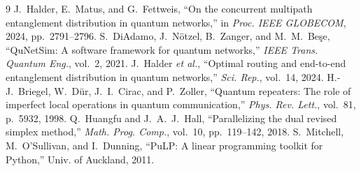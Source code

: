 \documentclass[conference]{IEEEtran}
\begin{document}
\begin{thebibliography}{9}
 J.~Halder, E.~Matus, and G.~Fettweis, ``On the concurrent multipath entanglement distribution in quantum networks,'' in \emph{Proc. IEEE GLOBECOM}, 2024, pp.~2791--2796.
 S.~DiAdamo, J.~N\"otzel, B.~Zanger, and M.~M.~Be\c{s}e, ``QuNetSim: A software framework for quantum networks,'' \emph{IEEE Trans. Quantum Eng.}, vol.~2, 2021.
 J.~Halder \emph{et al.}, ``Optimal routing and end-to-end entanglement distribution in quantum networks,'' \emph{Sci. Rep.}, vol.~14, 2024.
 H.-J.~Briegel, W.~D\"ur, J.~I.~Cirac, and P.~Zoller, ``Quantum repeaters: The role of imperfect local operations in quantum communication,'' \emph{Phys. Rev. Lett.}, vol.~81, p.~5932, 1998.
 Q.~Huangfu and J.~A.~J.~Hall, ``Parallelizing the dual revised simplex method,'' \emph{Math. Prog. Comp.}, vol.~10, pp.~119--142, 2018.
 S.~Mitchell, M.~O'Sullivan, and I.~Dunning, ``PuLP: A linear programming toolkit for Python,'' Univ. of Auckland, 2011.
\end{thebibliography}
\end{document}
